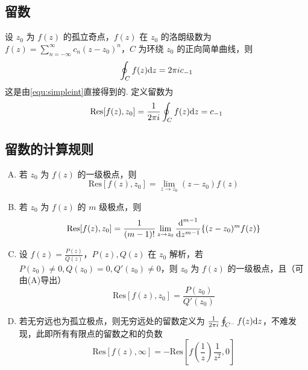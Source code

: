 \documentclass[./main.tex]{subfiles}
\begin{document}
\subsection{留数}
设 $z_0$ 为 $f(z)$ 的孤立奇点，$f(z)$ 在 $z_0$ 的洛朗级数为 $f(z)=\sum_{n=-\infty}^{\infty}c_n(z-z_0)^n$，$C$ 为环绕 $z_0$ 的正向简单曲线，则
\begin{equation}
    \oint_Cf(z)\text{d}z=2\pi ic_{-1}
\end{equation}
这是由\eqref{equ:simpleint}直接得到的. 定义留数为
\begin{equation}
    \text{Res}[f(z),z_0]=\frac{1}{2\pi i}\oint_Cf(z)\text{d}z=c_{-1}
\end{equation}
\subsection{留数的计算规则}
\begin{enumerate}[(A)]
    \item 若 $z_0$ 为 $f(z)$ 的一级极点，则 $$\text{Res}[f(z),z_0]=\lim\limits_{z\rightarrow z_0}(z-z_0)f(z)$$
    \item 若 $z_0$ 为 $f(z)$ 的 $m$ 级极点，则
    \begin{equation}
        \text{Res}[f(z),z_0]=\frac{1}{(m-1)!}\lim\limits_{z\rightarrow z_0}\frac{\text{d}^{m-1}}{\text{d}z^{m-1}}\{(z-z_0)^mf(z)\}
    \end{equation}
    \item 设 $f(z)=\frac{P(z)}{Q(z)}$，$P(z),Q(z)$ 在 $z_0$ 解析，若 $P(z_0)\neq 0,Q(z_0)=0,Q'(z_0)\neq 0$，则 $z_0$ 为 $f(z)$ 的一级极点，且（可由(A)导出） $$\text{Res}[f(z),z_0]=\frac{P(z_0)}{Q'(z_0)}$$
    \item 若无穷远也为孤立极点，则无穷远处的留数定义为 $\frac{1}{2\pi i}\oint_{C^-}f(z)\text{d}z$，不难发现，此即所有有限点的留数之和的负数 \begin{equation}
        \text{Res}[f(z),\infty]=-\text{Res}\left[f\left(\frac{1}{z}\right)\frac{1}{z^2},0\right]
    \end{equation}
\end{enumerate}
\end{document}
